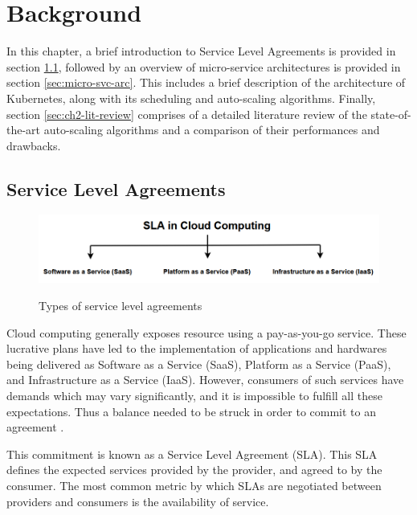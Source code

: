 \clearpage

\def\chaptertitle{Background}

\lhead{\emph{\chaptertitle}}

\chapter{\chaptertitle}
\label{ch:background}

In this chapter, a brief introduction to Service Level Agreements is provided in section \ref{sec:sla}, followed by an overview of micro-service architectures is provided in section \ref{sec:micro-svc-arc}. This includes a brief description of the architecture of Kubernetes, along with its scheduling and auto-scaling algorithms. Finally, section \ref{sec:ch2-lit-review} comprises of a detailed literature review of the state-of-the-art auto-scaling algorithms and a comparison of their performances and drawbacks.

\section{Service Level Agreements}
\label{sec:sla}

\begin{figure}[htb]
    \centering
    \caption{Types of service level agreements}
    \includegraphics[width=0.9\linewidth]{Figures/SLA-Cloud-Computing.png}
    \label{fig:sla-types}
\end{figure}

Cloud computing generally exposes resource using a pay-as-you-go service. These lucrative plans have led to the implementation of applications and hardwares being delivered as Software as a Service (SaaS), Platform as a Service (PaaS), and Infrastructure as a Service (IaaS). However, consumers of such services have demands which may vary significantly, and it is impossible to fulfill all these expectations. Thus a balance needed to be struck in order to commit to an agreement \cite{patel2009service}. \par
This commitment is known as a Service Level Agreement (SLA). This SLA defines the expected services provided by the provider, and agreed to by the consumer. The most common metric by which SLAs are negotiated between providers and consumers is the availability of service.

